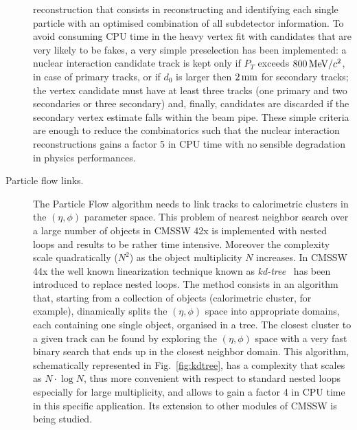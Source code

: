 \begin{description}
  reconstruction that consists in reconstructing and identifying each
  single particle with an optimised combination of all subdetector
  information. To avoid consuming CPU
  time in the heavy vertex fit with candidates that are very likely to
  be fakes, a very simple preselection has been implemented: a nuclear
  interaction candidate track is kept only if $P_T$ exceeds
  $800{\rm \, MeV}/c^2$, in case of primary tracks, or if $d_0$ is larger then
  $2\rm \, mm$ for secondary tracks; the vertex candidate must have at least
  three tracks (one primary and two secondaries or three secondary)
  and, finally, candidates are discarded if the
  secondary vertex estimate falls within the beam pipe. These simple
  criteria are enough to reduce the combinatorics such that the
  nuclear interaction reconstructions gains a factor 5 in CPU time with
  no sensible degradation in physics performances.
\item[Particle flow links.] The Particle Flow algorithm needs to link
  tracks to calorimetric clusters in the $(\eta, \phi)$ parameter space. This
  problem of nearest neighbor search 
  over a large number of objects in CMSSW 42x is implemented with
  nested loops and results to be rather time intensive. Moreover the
  complexity scale quadratically ($N^2$) as the object multiplicity
  $N$ increases. In CMSSW 44x the well known linearization technique
  known as {\em kd-tree}~\cite{kdtree} has been introduced to replace nested
  loops. The method consists in an algorithm that, starting from a
  collection of objects (calorimetric cluster, for example),
  dinamically splits the $(\eta, \phi)$ space into appropriate domains,
  each containing one single object, organised in a tree. The closest
  cluster to a given track can be found by 
  exploring the $(\eta, \phi)$ space with a very fast binary search
  that ends up in the closest neighbor domain. This algorithm,
  schematically represented in Fig.~\ref{fig:kdtree}, has a complexity
  that scales as $N\cdot\log N$, thus more convenient with respect to
  standard nested loops especially for large multiplicity, and allows to
  gain a factor 4 in CPU time in this specific application. Its
  extension to other modules of CMSSW is being studied.
\end{description}
